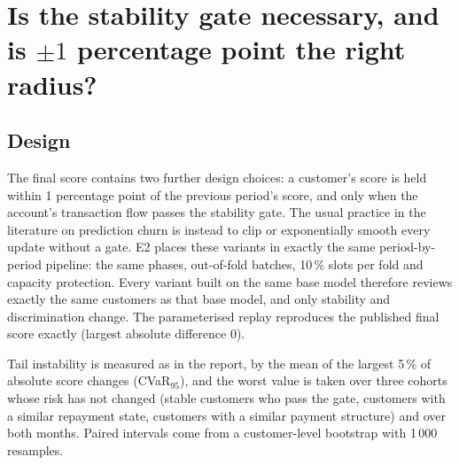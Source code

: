 \section{Is the stability gate necessary, and is \texorpdfstring{$\pm1$}{±1} percentage point the right radius?}

\subsection{Design}
The final score contains two further design choices: a customer's score is held within 1 percentage point of the previous period's score, and only when the account's transaction flow passes the stability gate. The usual practice in the literature on prediction churn is instead to clip or exponentially smooth every update without a gate\cite{fard2016,jiang2022}. E2 places these variants in exactly the same period-by-period pipeline: the same phases, out-of-fold batches, 10\,\% slots per fold and capacity protection. Every variant built on the same base model therefore reviews exactly the same customers as that base model, and only stability and discrimination change. The parameterised replay reproduces the published final score exactly (largest absolute difference 0).

Tail instability is measured as in the report, by the mean of the largest 5\,\% of absolute score changes (CVaR$_{95}$\cite{rockafellar2000}), and the worst value is taken over three cohorts whose risk has not changed (stable customers who pass the gate, customers with a similar repayment state, customers with a similar payment structure) and over both months. Paired intervals come from a customer-level bootstrap with 1\,000 resamples.

